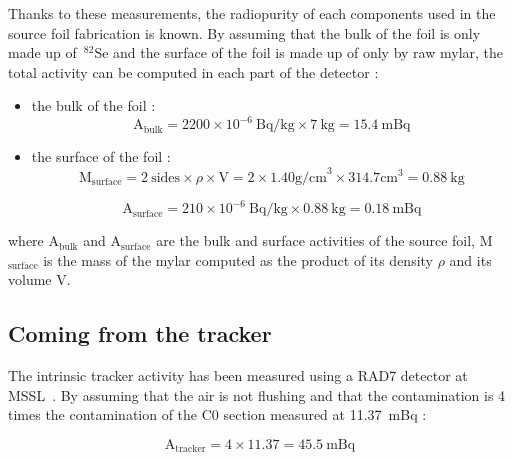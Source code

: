 \documentclass[main.tex]{subfiles}
\begin{document}
\bigskip


\noindent Thanks to these measurements, the radiopurity of each components used in the source foil fabrication is known. By assuming that the bulk of the foil is only made up of~$^{82}$Se and the surface of the foil is made up of only by raw mylar, the total activity can be computed in each part of the detector : 

\begin{itemize}
\item the bulk of the foil :
\begin{equation}
\text{A}_{\text{bulk}} =  \text{2200} \times \text{10}^{-\text{6}}~ \text{Bq/kg} \times \text{7}~\text{kg} = \text{15.4}~\text{mBq} 
\end{equation}

\item the surface of the foil :
\begin{equation}
\text{M}_{\text{surface}} = \text{2}~\text{sides} \times \rho \times \text{V} = \text{2} \times \text{1.40} \text{g/cm}^\text{3} \times \text{314.7} \text{cm}^\text{3} = \text{0.88}~\text{kg}
\end{equation}

\begin{equation}
\text{A}_{\text{surface}} = \text{210} \times \text{10}^{-\text{6}}~\text{Bq/kg} \times \text{0.88}~\text{kg} = \text{0.18}~\text{mBq} 
\end{equation}
\end{itemize}


\NI where A$_{\text{bulk}}$ and A$_{\text{surface}}$ are the bulk and surface activities of the source foil, M$_{\text{surface}}$ is the mass of the mylar computed as the product of its density $\rho$ and its volume V.


\subsection{Coming from the tracker}\label{sec:ActivityTracker}


\noindent The intrinsic tracker activity has been measured using a RAD7 detector at MSSL~\cite{RAD7measurement}. By assuming that the air is not flushing and that the contamination is 4 times the contamination of the C0 section measured at 11.37~mBq : 


\begin{equation}
\text{A}_{\text{tracker}} =  \text{4} \times  \text{11.37} = \text{45.5}~\text{mBq} 
\end{equation}
\end{document}
